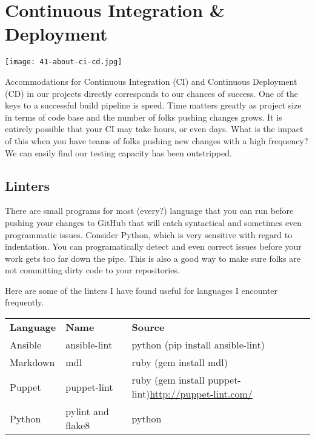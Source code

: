 \chapter{Continuous Integration \& Deployment}

\texttt{[image: 41-about-ci-cd.jpg]}

\justifying
Accommodations for Continuous Integration (CI) and Continuous Deployment
(CD) in our projects directly corresponds to our chances of success. One of the keys to
a successful build pipeline is speed. Time matters greatly as project size in terms of
code base and the number of folks pushing changes grows. It is entirely possible that
your CI may take hours, or even days. What is the impact of this when you have teams
of folks pushing new changes with a high frequency? We can easily find our testing
capacity has been outstripped.

\section{Linters}

\justifying
There are small programs for most (every?) language that you can run before
pushing your changes to GitHub that will catch syntactical and sometimes
even programmatic issues. Consider Python, which is very sensitive with
regard to indentation. You can programatically detect and even correct issues
before your work gets too far down the pipe. This is also a good way to
make sure folks are not committing dirty code to your repositories.

\justifying
Here are some of the linters I have found useful for languages I encounter
frequently.

\begin{table}[h]
	\begin{center}
		\begin{tabular}{| p{2.5cm}| p{2.5cm} | p{2.5cm} |}
			\hline
			\textbf{Language} & \textbf{Name} & \textbf{Source}\hfill                                                        \\
			Ansible           & ansible-lint  & python (pip install ansible-lint)                                      \\
			Markdown          & mdl           & ruby (gem install mdl)                                                 \\
			Puppet            & puppet-lint   & ruby (gem install puppet-lint)\url{http://puppet-lint.com/} \\
			Python            & pylint and flake8 & python \\
		\end{tabular}
	\end{center}
\end{table}



